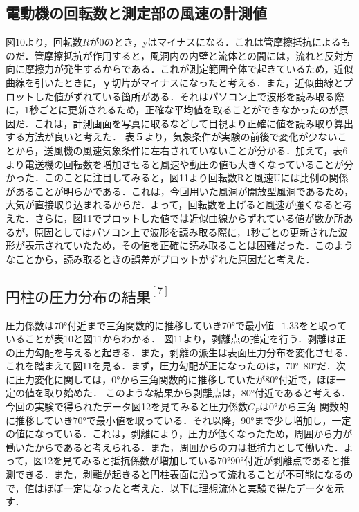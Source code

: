 \documentclass[a4paper,titlepage]{ltjsarticle}
\begin{document}
\subsection{電動機の回転数と測定部の風速の計測値}
図10より，回転数$R$が0のとき，yはマイナスになる．これは管摩擦抵抗によるものだ．管摩擦抵抗が作用すると，風洞内の内壁と流体との間には，流れと反対方向に摩擦力が発生するからである．これが測定範囲全体で起きているため，近似曲線を引いたときに，ｙ切片がマイナスになったと考える．また，近似曲線とプロットした値がずれている箇所がある．それはパソコン上で波形を読み取る際に，1秒ごとに更新されるため，正確な平均値を取ることができなかったのが原因だ．これは，計測画面を写真に取るなどして目視より正確に値を読み取り算出する方法が良いと考えた．
表５より，気象条件が実験の前後で変化が少ないことから，送風機の風速気象条件に左右されていないことが分かる．加えて，表6より電送機の回転数を増加させると風速や動圧の値も大きくなっていることが分かった．このことに注目してみると，図11より回転数Rと風速Uには比例の関係があることが明らかである．これは，今回用いた風洞が開放型風洞であるため，大気が直接取り込まれるからだ．よって，回転数を上げると風速が強くなると考えた．さらに，図11でプロットした値では近似曲線からずれている値が数か所あるが，原因としてはパソコン上で波形を読み取る際に，1秒ごとの更新された波形が表示されていたため，その値を正確に読み取ることは困難だった．このようなことから，読み取るときの誤差がプロットがずれた原因だと考えた．


\subsection{$円柱の圧力分布の結果^{[7]}$}
圧力係数は$\ang{70}$付近まで三角関数的に推移していき\ang{70}で最小値$-1.33$をと取っていることが表10と図11からわかる．
図11より，剥離点の推定を行う．剥離は正の圧力勾配を与えると起きる．また，剥離の派生は表面圧力分布を変化させる．これを踏まえて図11を見る．まず，圧力勾配が正になったのは，\ang{70}~\ang{80}だ．次に圧力変化に関しては，\ang{0}から三角関数的に推移していたが\ang{80}付近で，ほぼ一定の値を取り始めた．
このような結果から剥離点は，\ang{80}付近であると考える．
今回の実験で得られたデータ図12を見てみると圧力係数$C_P$は$\ang{0}$から三角
関数的に推移していき$\ang{70}$で最小値を取っている．それ以降，\ang{90}まで少し増加し，一定の値になっている．これは，剥離により，圧力が低くなったため，周囲から力が働いたからであると考えられる．また，周囲からの力は抵抗力として働いた．よって，図12を見てみると抵抗係数が増加している$\ang{70}$\thicksim $\ang{90}$付近が剥離点であると推測できる．また，剥離が起きると円柱表面に沿って流れることが不可能になるので，値はほぼ一定になったと考えた．以下に理想流体と実験で得たデータを示す．
\end{document}
